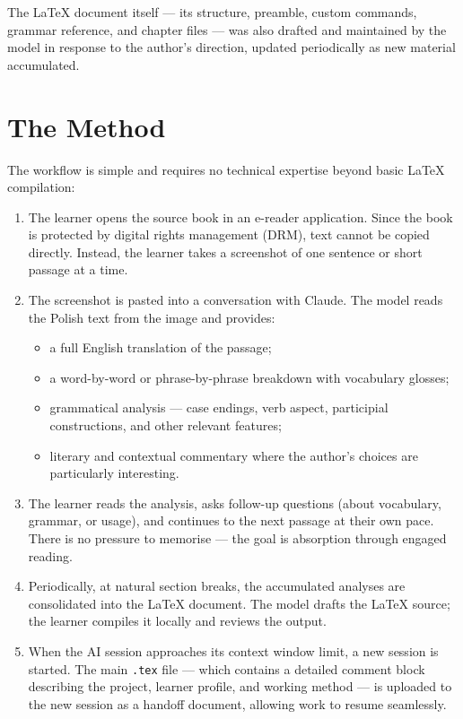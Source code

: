 The \LaTeX{} document itself --- its structure, preamble, custom
commands, grammar reference, and chapter files --- was also drafted
and maintained by the model in response to the author's direction,
updated periodically as new material accumulated.

\section*{The Method}

The workflow is simple and requires no technical expertise beyond
basic \LaTeX{} compilation:

\begin{enumerate}

  \item The learner opens the source book in an e-reader application.
  Since the book is protected by digital rights management (DRM),
  text cannot be copied directly. Instead, the learner takes a
  screenshot of one sentence or short passage at a time.

  \item The screenshot is pasted into a conversation with Claude.
  The model reads the Polish text from the image and provides:
  \begin{itemize}
    \item a full English translation of the passage;
    \item a word-by-word or phrase-by-phrase breakdown with
      vocabulary glosses;
    \item grammatical analysis --- case endings, verb aspect,
      participial constructions, and other relevant features;
    \item literary and contextual commentary where the author's
      choices are particularly interesting.
  \end{itemize}

  \item The learner reads the analysis, asks follow-up questions
  (about vocabulary, grammar, or usage), and continues to the
  next passage at their own pace. There is no pressure to
  memorise --- the goal is absorption through engaged reading.

  \item Periodically, at natural section breaks, the accumulated
  analyses are consolidated into the \LaTeX{} document. The model
  drafts the \LaTeX{} source; the learner compiles it locally
  and reviews the output.

  \item When the AI session approaches its context window limit,
  a new session is started. The main \texttt{.tex} file --- which
  contains a detailed comment block describing the project,
  learner profile, and working method --- is uploaded to the new
  session as a handoff document, allowing work to resume
  seamlessly.

\end{enumerate}

